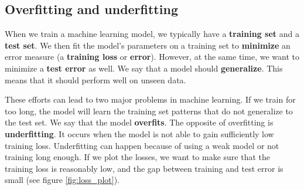 

    \subsection{Overfitting and underfitting}

    When we train a machine learning model, we typically have a
    \textbf{training set} and a \textbf{test set}. We then fit the model's
    parameters on a training set to \textbf{minimize} an error measure
    (a \textbf{training loss} or \textbf{error}). However, at the same time, we want
    to minimize a \textbf{test error} as well. We say that a model should
    \textbf{generalize}. This means that it should perform well on unseen data.

    These efforts can lead to two major problems in machine learning. If we train
    for too long, the model will learn the training set patterns that do not
    generalize to the test set. We say that the model \textbf{overfits}. The
    opposite of overfitting is \textbf{underfitting}. It occurs when the model is
    not able to gain sufficiently low training loss. Underfitting can happen because
    of using a weak model or not training long enough. If we plot the losses, we
    want to make sure that the training loss is reasonably low, and the gap between
    training and test error is small (see figure \ref{fig:loss_plot}).

